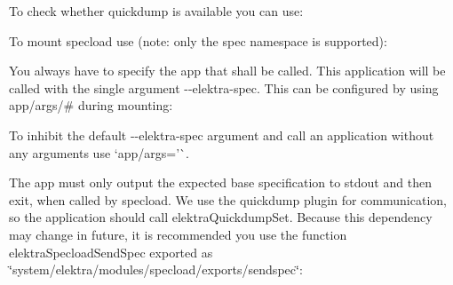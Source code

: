 To check whether {\ttfamily quickdump} is available you can use\+:


\begin{DoxyCode}{0}
\end{DoxyCode}


To mount {\ttfamily specload} use (note\+: only the {\ttfamily spec} namespace is supported)\+:


\begin{DoxyCode}{0}
\end{DoxyCode}


You always have to specify the {\ttfamily app} that shall be called. This application will be called with the single argument {\ttfamily -\/-\/elektra-\/spec}. This can be configured by using {\ttfamily app/args/\#} during mounting\+:


\begin{DoxyCode}{0}
\end{DoxyCode}


To inhibit the default {\ttfamily -\/-\/elektra-\/spec} argument and call an application without any arguments use `\textquotesingle{}app/args='\`{}.

The app must only output the expected base specification to {\ttfamily stdout} and then exit, when called by {\ttfamily specload}. We use the {\ttfamily quickdump} plugin for communication, so the application should call {\ttfamily elektra\+Quickdump\+Set}. Because this dependency may change in future, it is recommended you use the function {\ttfamily elektra\+Specload\+Send\+Spec} exported as {\ttfamily \char`\"{}system/elektra/modules/specload/exports/sendspec\char`\"{}}\+:


